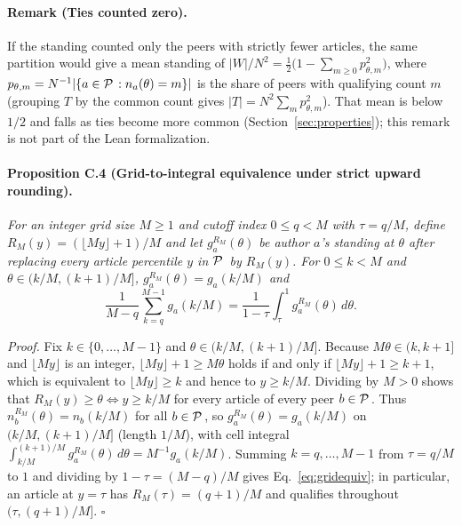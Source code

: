 \documentclass[11pt]{article}
\begin{document}
\paragraph{Remark (Ties counted zero).}
If the standing counted only the peers with strictly fewer articles, the same partition would give a mean standing of
$|W|/N^2 = \tfrac12\bigl(1 - \sum_{m \ge 0} p_{\theta,m}^2\bigr)$, where $p_{\theta,m} = N^{-1}|\{a \in {\mathcal{P}\mkern2.5mu} :
n_a(\theta) = m\}|$ is the share of peers with qualifying count $m$ (grouping $T$ by the common count gives $|T| = N^2
\sum_{m} p_{\theta,m}^2$). That mean is below $1/2$ and falls as ties become more common (Section~\ref{sec:properties});
this remark is not part of the Lean formalization.

\paragraph{Proposition C.4 (Grid-to-integral equivalence under strict upward rounding).}
\emph{For an integer grid size $M \ge 1$ and cutoff index $0 \le q < M$ with $\tau = q/M$, define $R_M(y) = (\lfloor M y
\rfloor + 1)/M$ and let $g_a^{R_M}(\theta)$ be author $a$'s standing at $\theta$ after replacing every article percentile
$y$ in ${\mathcal{P}\mkern2.5mu}$ by $R_M(y)$. For $0 \le k < M$ and $\theta \in (k/M, (k+1)/M]$, $g_a^{R_M}(\theta) = g_a(k/M)$ and}
\begin{equation}
  \frac{1}{M - q}\sum_{k=q}^{M-1} g_a(k/M) = \frac{1}{1-\tau}\int_\tau^1 g_a^{R_M}(\theta)\, d\theta .
  \label{eq:gridequiv}
\end{equation}

\noindent\emph{Proof.}
Fix $k \in \{0, \dots, M-1\}$ and $\theta \in (k/M, (k+1)/M]$. Because $M\theta \in (k, k+1]$ and $\lfloor M y \rfloor$
is an integer, $\lfloor M y \rfloor + 1 \ge M\theta$ holds if and only if $\lfloor M y \rfloor + 1 \ge k + 1$, which is
equivalent to $\lfloor M y \rfloor \ge k$ and hence to $y \ge k/M$. Dividing by $M > 0$ shows that $R_M(y) \ge \theta
\iff y \ge k/M$ for every article of every peer $b \in {\mathcal{P}\mkern2.5mu}$. Thus $n_b^{R_M}(\theta) = n_b(k/M)$ for all $b \in
{\mathcal{P}\mkern2.5mu}$, so $g_a^{R_M}(\theta) = g_a(k/M)$ on $(k/M, (k+1)/M]$ (length $1/M$), with cell integral $\int_{k/M}^{(k+1)/M}
g_a^{R_M}(\theta)\, d\theta = M^{-1} g_a(k/M)$. Summing $k = q, \dots, M-1$ from $\tau = q/M$ to $1$ and dividing by
$1 - \tau = (M-q)/M$ gives Eq.~\ref{eq:gridequiv}; in particular, an article at $y = \tau$ has $R_M(\tau) = (q+1)/M$ and
qualifies throughout $(\tau, (q+1)/M]$. \hfill$\square$
\end{document}

